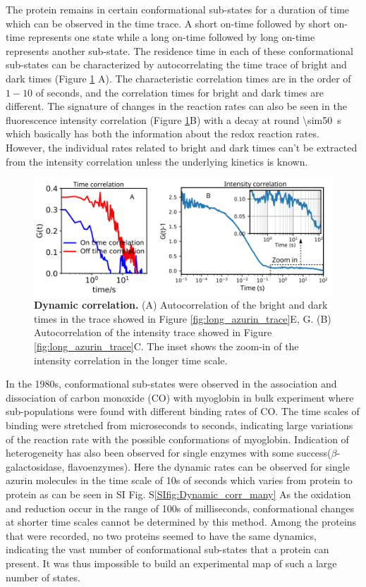 The protein remains in certain conformational sub-states for a duration of time which can be observed in the time trace.
A short on-time followed by short on-time represents one state while a long on-time followed by long on-time represents another sub-state.
The residence time in each of these conformational sub-states can be characterized by autocorrelating the time trace of bright and dark times (Figure \ref{fig:Dynamic_corr} A).
The characteristic correlation times are in the order of $1-10$ of seconds, and the correlation times for bright and dark times are different.
The signature of changes in the reaction rates can also be seen in the fluorescence intensity correlation (Figure \ref{fig:Dynamic_corr}B) with a decay at round \SI{\sim50}{\s} which basically has both the information about the redox reaction rates.
However, the individual rates related to bright and dark times can't be extracted from the intensity correlation unless the underlying kinetics is known.
\begin{figure}
	\centering
	\includegraphics[width=\textwidth]{Dynamic_corr}
	\caption{\textbf{Dynamic correlation.} (A) Autocorrelation of the bright and dark times in the trace showed in Figure \ref{fig:long_azurin_trace}E, G. (B) Autocorrelation of the intensity trace showed in Figure \ref{fig:long_azurin_trace}C. The inset shows the zoom-in of the intensity correlation in the longer time scale.}
	\label{fig:Dynamic_corr}
\end{figure}

In the 1980s, conformational sub-states were observed in the association and dissociation of carbon monoxide (CO) with myoglobin in bulk experiment where sub-populations were found with different binding rates of CO.
The time scales of binding were stretched from microseconds to seconds, indicating large variations of the reaction rate with the possible conformations of myoglobin.
Indication of heterogeneity has also been observed for single enzymes with some success($\beta$-galactosidase, flavoenzymes)\cite{lu1998single-molecule,kou2005single-molecule,english2006ever-fluctuating}.
Here the dynamic rates can be observed for single azurin molecules in the time scale of 10s of seconds which varies from protein to protein as can be seen in SI Fig. S\ref{SIfig:Dynamic_corr_many}
As the oxidation and reduction occur in the range of 100s of milliseconds, conformational changes at shorter time scales cannot be determined by this method.
Among the proteins that were recorded, no two proteins seemed to have the same dynamics, indicating the vast number of conformational sub-states that a protein can present.
It was thus impossible to build an experimental map of such a large number of states.

